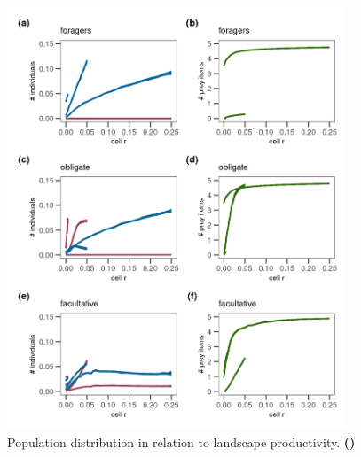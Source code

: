 \documentclass[11pt]{article}
\begin{document}
\begin{figure}[h!]
    \centering
    \includegraphics[width=0.90\textwidth]{figures/fig_05_agent_distribution.png}
    \caption{Population distribution in relation to landscape productivity.
    \textbf{()}}
    \label{Fig:AgentDistribution}
\end{figure}
\end{document}
